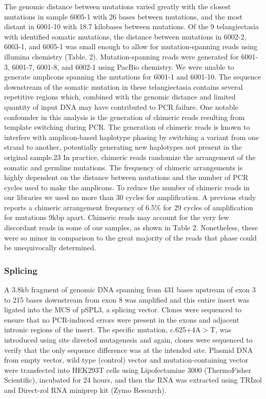 The genomic distance between mutations varied greatly with the closest mutations in sample 6005-1 with 26 bases between mutations, and the most distant in 6001-10 with 18.7 kilobases between mutations. Of the 9 telangiectasia with identified somatic mutations, the distance between mutations in 6002-2, 6003-1, and 6005-1 was small enough to allow for mutation-spanning reads using illumina chemistry (Table. 2). Mutation-spanning reads were generated for 6001-3, 6001-7, 6001-8, and 6002-1 using PacBio chemistry. We were unable to generate amplicons spanning the mutations for 6001-1 and 6001-10. The sequence downstream of the somatic mutation in these telangiectasia contains several repetitive regions which, combined with the genomic distance and limited quantity of input DNA may have contributed to PCR failure. 
One notable confounder in this analysis is the generation of chimeric reads resulting from template switching during PCR. The generation of chimeric reads is known to interfere with amplicon-based haplotype phasing by switching a variant from one strand to another, potentially generating new haplotypes not present in the original sample.23 In practice, chimeric reads randomize the arrangement of the somatic and germline mutations. The frequency of chimeric arrangements is highly dependent on the distance between mutations and the number of PCR cycles used to make the amplicons. To reduce the number of chimeric reads in our libraries we used no more than 30 cycles for amplification. A previous study reports a chimeric arrangement frequency of 6.5\% for 29 cycles of amplification for mutations 9kbp apart.\citep{laver2016} Chimeric reads may account for the very few discordant reads in some of our samples, as shown in Table 2.  Nonetheless, these were so minor in comparison to the great majority of the reads that phase could be unequivocally determined.

\subsubsection{ Splicing}
A 3.8kb fragment of  genomic DNA spanning from 431 bases upstream of exon 3 to 215 bases downstream from exon 8 was amplified and this entire insert was ligated into the MCS of pSPL3, a splicing vector.\citep{church1994}  Clones were sequenced to ensure that no PCR-induced errors were present in the exons and adjacent intronic regions of the insert.  The specific mutation, c.625+4A$>$T, was introduced using site directed mutagenesis and again, clones were sequenced to verify that the only sequence difference was at the intended site. Plasmid DNA from empty vector, wild type (control) vector and mutation-containing vector were transfected into HEK293T cells using Lipofectamine 3000 (ThermoFisher Scientific), incubated for 24 hours, and then the RNA was extracted using TRIzol and Direct-zol RNA miniprep kit (Zymo Research).  

